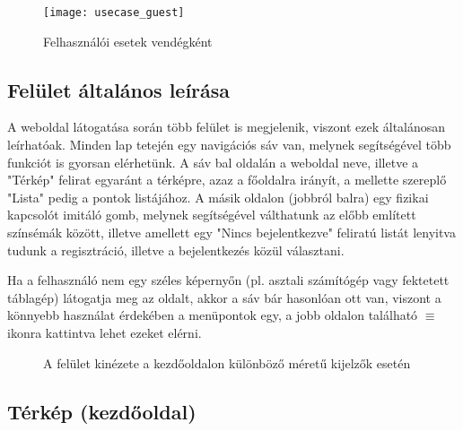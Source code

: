 \begin{figure}[H]
	\centering
	\texttt{[image: usecase\_guest]}
	\caption{Felhasználói esetek vendégként}
	\label{fig:usecase_guest}
\end{figure}

\subsection{Felület általános leírása}

A weboldal látogatása során több felület is megjelenik, viszont ezek általánosan leírhatóak. Minden lap tetején egy navigációs sáv van, melynek segítségével több funkciót is gyorsan elérhetünk. A sáv bal oldalán a weboldal neve, illetve a "Térkép" felirat egyaránt a térképre, azaz a főoldalra irányít, a mellette szereplő "Lista" pedig a pontok listájához. A másik oldalon (jobbról balra) egy fizikai kapcsolót imitáló gomb, melynek segítségével válthatunk az előbb említett színsémák között, illetve amellett egy "Nincs bejelentkezve" feliratú listát lenyitva tudunk a regisztráció, illetve a bejelentkezés közül választani.\par
Ha a felhasználó nem egy széles képernyőn (pl. asztali számítógép vagy fektetett táblagép) látogatja meg az oldalt, akkor a sáv bár hasonlóan ott van, viszont a könnyebb használat érdekében a menüpontok egy, a jobb oldalon található \hspace{0.1cm}\boldmath\(\equiv\)\hspace{0.1cm} ikonra kattintva lehet ezeket elérni.

\begin{figure}[H]
	\centering
	\hspace{5pt}
		\hspace{5pt}
	\caption{A felület kinézete a kezdőoldalon különböző méretű kijelzők esetén}
	\label{fig:map_guest}
\end{figure}

\subsection{Térkép (kezdőoldal)}

